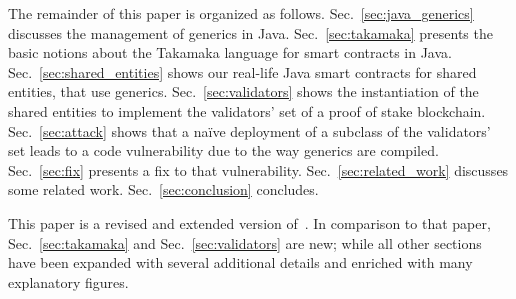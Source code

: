 The remainder of this paper is organized as follows.
Sec.~\ref{sec:java_generics} discusses the management of generics in Java.
Sec.~\ref{sec:takamaka} presents the basic notions about the Takamaka language for smart contracts in Java.
Sec.~\ref{sec:shared_entities} shows our real-life Java smart
contracts for shared entities, that use generics.
Sec.~\ref{sec:validators} shows the instantiation of the shared entities to implement the validators' set
of a proof of stake blockchain.
Sec.~\ref{sec:attack} shows that a na\"{i}ve
deployment of a subclass of the validators' set leads to a code vulnerability
due to the way generics are compiled.
Sec.~\ref{sec:fix} presents a fix to that vulnerability.
Sec.~\ref{sec:related_work} discusses some related work.
Sec.~\ref{sec:conclusion} concludes.

This paper is a revised and extended version of~\cite{BeniniGMS21}.
In comparison to that paper, Sec.~\ref{sec:takamaka} and
Sec.~\ref{sec:validators} are new; while all other sections have been expanded with several additional details and enriched with many explanatory figures.
